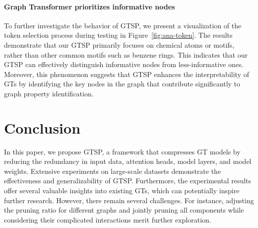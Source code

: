 \documentclass[letterpaper]{article} %
\begin{document}
\paragraph{Graph Transformer prioritizes informative nodes} 
To further investigate the behavior of GTSP, we present a visualization of the token selection process during testing in Figure~\ref{fig:ana-token}. The results demonstrate that our GTSP primarily focuses on chemical atoms or motifs, rather than other common motifs such as benzene rings. This indicates that our GTSP can effectively distinguish informative nodes from less-informative ones. Moreover, this phenomenon suggests that GTSP enhances the interpretability of GTs by identifying the key nodes in the graph that contribute significantly to graph property identification.













\section{Conclusion}


In this paper, we propose GTSP, a framework that compresses GT models by reducing the redundancy in input data, attention heads, model layers, and model weights. Extensive experiments on large-scale datasets demonstrate the effectiveness and  generalizability of GTSP. Furthermore, the experimental results offer several valuable insights into existing GTs, which can potentially inspire further research. However, there remain several challenges. For instance, adjusting the pruning ratio for different graphs and jointly pruning all components while considering their complicated interactions merit further exploration.




\end{document}
